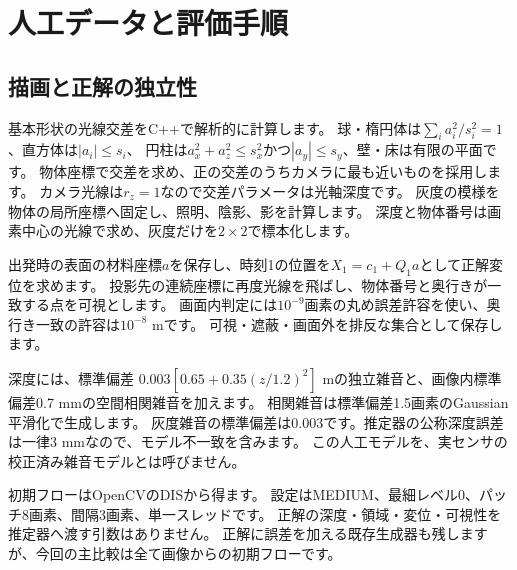 \documentclass[a4paper,11pt]{ltjsarticle}
\theoremstyle{definition}
\begin{document}
\section{人工データと評価手順}
\subsection{描画と正解の独立性}
基本形状の光線交差をC++で解析的に計算します。
球・楕円体は$\sum_i a_i^2/s_i^2=1$、直方体は$|a_i|\le s_i$、
円柱は$a_x^2+a_z^2\le s_x^2$かつ$|a_y|\le s_y$、壁・床は有限の平面です。
物体座標で交差を求め、正の交差のうちカメラに最も近いものを採用します。
カメラ光線は$r_z=1$なので交差パラメータは光軸深度です。
灰度の模様を物体の局所座標へ固定し、照明、陰影、影を計算します。
深度と物体番号は画素中心の光線で求め、灰度だけを$2\times2$で標本化します。

出発時の表面の材料座標$a$を保存し、時刻1の位置を$X_1=c_1+Q_1a$として正解変位を求めます。
投影先の連続座標に再度光線を飛ばし、物体番号と奥行きが一致する点を可視とします。
画面内判定には$10^{-9}$画素の丸め誤差許容を使い、奥行き一致の許容は$10^{-8}$ mです。
可視・遮蔽・画面外を排反な集合として保存します。

深度には、標準偏差
$0.003[0.65+0.35(z/1.2)^2]$ mの独立雑音と、画像内標準偏差0.7 mmの空間相関雑音を加えます。
相関雑音は標準偏差1.5画素のGaussian平滑化で生成します。
灰度雑音の標準偏差は0.003です。推定器の公称深度誤差は一律3 mmなので、モデル不一致を含みます。
この人工モデルを、実センサの校正済み雑音モデルとは呼びません。

初期フローはOpenCVのDISから得ます\cite{dis}。
設定はMEDIUM、最細レベル0、パッチ8画素、間隔3画素、単一スレッドです。
正解の深度・領域・変位・可視性を推定器へ渡す引数はありません。
正解に誤差を加える既存生成器も残しますが、今回の主比較は全て画像からの初期フローです。
\end{document}
